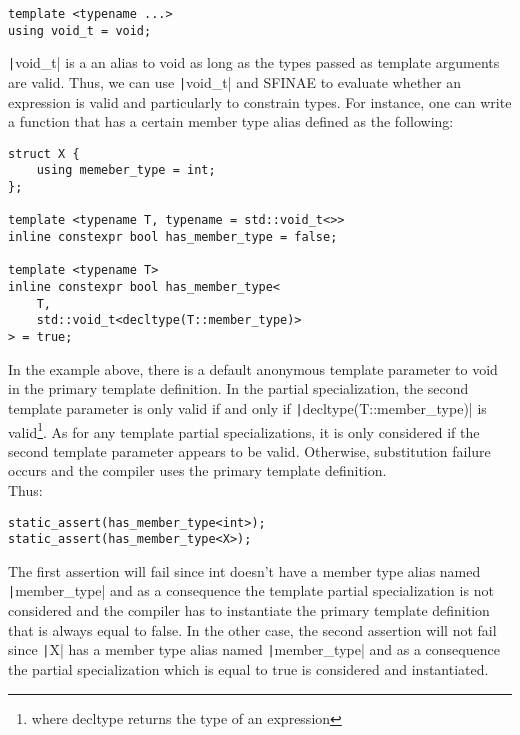 \begin{paracol}{2}
\vspace{10pt}
\begin{verbatim}
template <typename ...>
using void_t = void;
\end{verbatim}

\switchcolumn

\texttt|void_t| is a an alias to void as long as the types passed as template arguments are valid. Thus, we can use \texttt|void_t| and SFINAE to evaluate whether an expression is valid and particularly to constrain types. For instance, one can write a function that has a certain member type alias defined as the following:
\end{paracol}

\begin{verbatim}
struct X {
    using memeber_type = int;
};

template <typename T, typename = std::void_t<>>
inline constexpr bool has_member_type = false;

template <typename T>
inline constexpr bool has_member_type<
    T,
    std::void_t<decltype(T::member_type)>
> = true;
\end{verbatim}

In the example above, there is a default anonymous template parameter to void in the primary template definition. In the partial specialization, the second template parameter is only valid if and only if \texttt|decltype(T::member_type)| is valid\footnote{where decltype returns the type of an expression}. As for any template partial specializations, it is only considered if the second template parameter appears to be valid. Otherwise, substitution failure occurs and the compiler uses the primary template definition. \\

Thus:
\begin{verbatim}
static_assert(has_member_type<int>);
static_assert(has_member_type<X>);
\end{verbatim}

The first assertion will fail since int doesn't have a member type alias named \texttt|member_type| and as a consequence the template partial specialization is not considered and the compiler has to instantiate the primary template definition that is always equal to false. In the other case, the second assertion will not fail since \texttt|X| has a member type alias named \texttt|member_type| and as a consequence the partial specialization which is equal to true is considered and instantiated. \\


